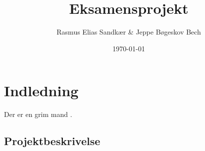 \documentclass[11pt]{article}
\author{Rasmus Elias Sandkær \& Jeppe Bøgeskov Bech}
\date{\today}
\title{Eksamensprojekt}
\begin{document}


\restoregeometry
\tableofcontents
\newpage

\section{Indledning}
Der er en grim mand .


\newpage
\printbibliography[heading=bibintoc,title={Litteraturliste}]

\newpage
\begin{appendices}\newpage
    \renewcommand{\thesubsection}{\Alph{subsection}}
    \subsection{Projektbeskrivelse \label{apx:projektbeskrivels}} \newpage
    \renewcommand*{\thepage}{A\arabic{page}}
    
\end{appendices}
\end{document}
